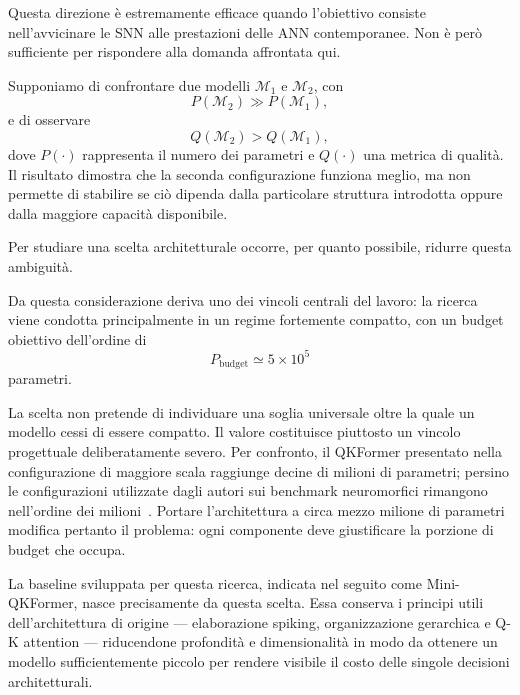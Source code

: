 Questa direzione è estremamente efficace quando l'obiettivo consiste nell'avvicinare le SNN alle prestazioni delle ANN contemporanee. Non è però sufficiente per rispondere alla domanda affrontata qui.

Supponiamo di confrontare due modelli $\mathcal{M}_1$ e $\mathcal{M}_2$, con
\begin{equation*}
P(\mathcal{M}_2) \gg P(\mathcal{M}_1),
\end{equation*}
e di osservare
\begin{equation*}
Q(\mathcal{M}_2) > Q(\mathcal{M}_1),
\end{equation*}
dove $P(\cdot)$ rappresenta il numero dei parametri e $Q(\cdot)$ una metrica di qualità. Il risultato dimostra che la seconda configurazione funziona meglio, ma non permette di stabilire se ciò dipenda dalla particolare struttura introdotta oppure dalla maggiore capacità disponibile.

Per studiare una scelta architetturale occorre, per quanto possibile, ridurre questa ambiguità.

Da questa considerazione deriva uno dei vincoli centrali del lavoro: la ricerca viene condotta principalmente in un regime fortemente compatto, con un budget obiettivo dell'ordine di
\begin{equation}
\label{eq:budget_obiettivo}
P_{\mathrm{budget}} \simeq 5 \times 10^5
\end{equation}
parametri.

La scelta non pretende di individuare una soglia universale oltre la quale un modello cessi di essere compatto. Il valore costituisce piuttosto un vincolo progettuale deliberatamente severo. Per confronto, il QKFormer presentato nella configurazione di maggiore scala raggiunge decine di milioni di parametri; persino le configurazioni utilizzate dagli autori sui benchmark neuromorfici rimangono nell'ordine dei milioni~\cite{zhou2024qkformer}. Portare l'architettura a circa mezzo milione di parametri modifica pertanto il problema: ogni componente deve giustificare la porzione di budget che occupa.

La baseline sviluppata per questa ricerca, indicata nel seguito come Mini-QKFormer, nasce precisamente da questa scelta. Essa conserva i principi utili dell'architettura di origine --- elaborazione spiking, organizzazione gerarchica e Q-K attention --- riducendone profondità e dimensionalità in modo da ottenere un modello sufficientemente piccolo per rendere visibile il costo delle singole decisioni architetturali.

